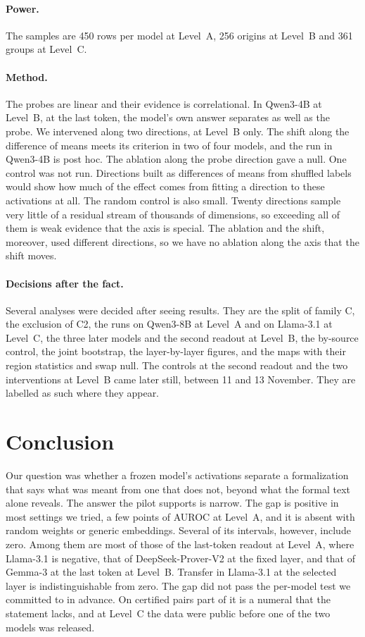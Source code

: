 \documentclass[10pt]{article}
\begin{document}
\paragraph{Power.}
The samples are 450 rows per model at Level~A, 256 origins at Level~B and 361 groups at Level~C.

\paragraph{Method.}
The probes are linear and their evidence is correlational. In Qwen3-4B at Level~B, at the last token, the model's own answer separates as well as the probe. We intervened along two directions, at Level~B only. The shift along the difference of means meets its criterion in
two of four models, and the run in Qwen3-4B is post hoc. The ablation along the probe direction gave a null.
One control was not run. Directions built as differences of means from shuffled labels would show how much of the
effect comes from fitting a direction to these activations at all.
The random control is also small. Twenty directions sample very little of a residual stream of thousands of
dimensions, so exceeding all of them is weak evidence that the axis is special. The ablation and the shift, moreover,
used different directions, so we have no ablation along the axis that the shift moves.

\paragraph{Decisions after the fact.}
Several analyses were decided after seeing results. They are the split of family C, the exclusion of C2, the runs on Qwen3-8B at Level~A and on Llama-3.1 at Level~C, the three later models and the second readout at Level~B, the by-source
control, the joint bootstrap, the layer-by-layer figures, and the maps with their region statistics and swap null.
The controls at the second readout and the two interventions at Level~B came later still, between 11 and 13
November. They are labelled as such where they appear.

\section{Conclusion}

Our question was whether a frozen model's activations separate a formalization that says what was meant from
one that does not, beyond what the formal text alone reveals. The answer the pilot supports is narrow. The gap is
positive in most settings we tried, a few points of AUROC at Level~A, and it is absent with random weights or
generic embeddings. Several of its intervals, however, include zero. Among them are most of those of the last-token readout at Level~A, where Llama-3.1 is negative, that of
DeepSeek-Prover-V2 at the fixed layer, and that of Gemma-3 at the last token at Level~B. Transfer in
Llama-3.1 at the selected layer is indistinguishable from zero. The gap did not pass the per-model test we
committed to in advance. On certified pairs part of it is a numeral that the statement lacks, and at Level~C the
data were public before one of the two models was released.
\end{document}
